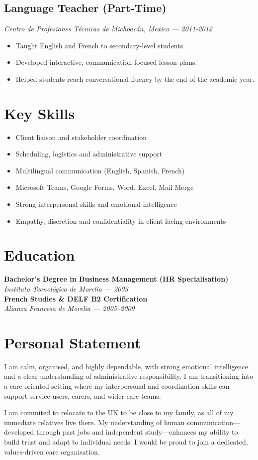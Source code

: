 \documentclass[11pt,a4paper]{article}
\begin{document}
	\subsection*{Language Teacher (Part-Time)}
	\textit{Centro de Profesiones T\'ecnicas de Michoac\'an, Mexico --- 2011-2012}
	\begin{itemize}[leftmargin=*]
		\item Taught English and French to secondary-level students.
		\item Developed interactive, communication-focused lesson plans.
		\item Helped students reach conversational fluency by the end of the academic year.
	\end{itemize}
	
	\section*{Key Skills}
	\begin{itemize}[leftmargin=*]
		\item Client liaison and stakeholder coordination
		\item Scheduling, logistics and administrative support
		\item Multilingual communication (English, Spanish, French)
		\item Microsoft Teams, Google Forms, Word, Excel, Mail Merge
		\item Strong interpersonal skills and emotional intelligence
		\item Empathy, discretion and confidentiality in client-facing environments
	\end{itemize}
	
	\section*{Education}
	\textbf{Bachelor’s Degree in Business Management (HR Specialisation)}\\
	\textit{Instituto Tecnol\'ogico de Morelia --- 2003} \\[1mm]
	\textbf{French Studies \& DELF B2 Certification}\\
	\textit{Alianza Francesa de Morelia --- 2005--2009}
	
	\section*{Personal Statement}
	I am calm, organised, and highly dependable, with strong emotional intelligence and a clear understanding of administrative responsibility. I am transitioning into a care-oriented setting where my interpersonal and coordination skills can support service users, carers, and wider care teams.
	
	I am commited to relocate to the UK to be close to my family, as all of my immediate relatives live there. My understanding of human communication—developed through past jobs and independent study—enhances my ability to build trust and adapt to individual needs. I would be proud to join a dedicated, values-driven care organisation.
	
	
\end{document}
